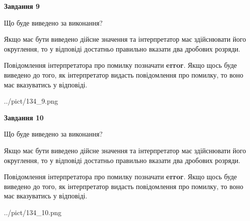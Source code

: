 \documentclass[12pt, ukrainian]{article}
\begin{document}
{\begin {Large}
{\begin {center}\textbf{Завдання 9}\end {center}}\par
Що буде виведено за виконання? \par

Якщо має бути виведено дійсне значення та інтерпретатор має здійснювати його округлення, 
то у відповіді достатньо правильно вказати два дробових розряди.

Повідомлення інтерпретатора про помилку позначати \textbf{error}.
Якщо щось буде виведено до того, як інтерпретатор видасть повідомлення про помилку, 
то воно має вказуватись у відповіді. \par

\begin{center}
	{../pict/134_9.png}
\end{center}
\newpage

{\begin {center}\textbf{Завдання 10}\end {center}}\par
Що буде виведено за виконання? \par

Якщо має бути виведено дійсне значення та інтерпретатор має здійснювати його округлення, 
то у відповіді достатньо правильно вказати два дробових розряди.

Повідомлення інтерпретатора про помилку позначати \textbf{error}.
Якщо щось буде виведено до того, як інтерпретатор видасть повідомлення про помилку, 
то воно має вказуватись у відповіді. \par

\begin{center}
	{../pict/134_10.png}
\end{center}
\newpage

\end {Large}}
\end{document}

